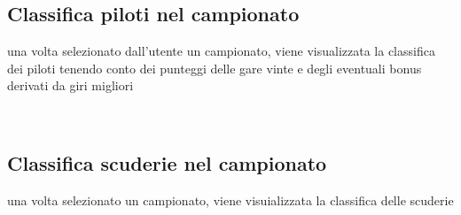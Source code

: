 \documentclass[a4paper,12pt]{report}
\begin{document}
	\subsection{Classifica piloti nel campionato}
	una volta selezionato dall'utente un campionato, viene visualizzata la classifica dei piloti
	tenendo conto dei punteggi delle gare vinte e degli eventuali bonus derivati da giri migliori
	\begin{table}[!htb]
		\centering
		\begin{center}
		\end{center}
	\end{table}\\
	\subsection{Classifica scuderie nel campionato}
	una volta selezionato un campionato, viene visuializzata la classifica delle scuderie
	\begin{table}[!htb]
		\centering
		\begin{center}
		\end{center}
	\end{table}\\
\end{document}
